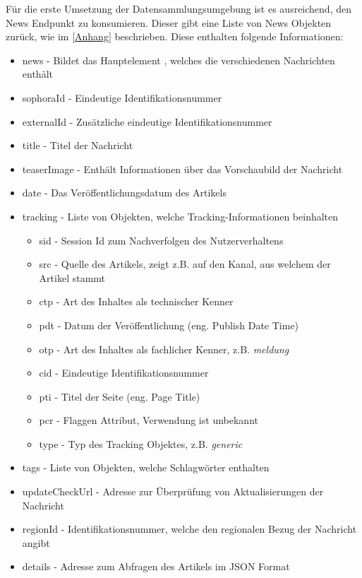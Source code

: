 Für die erste Umsetzung der Datensammlungsumgebung ist es ausreichend, den News Endpunkt zu konsumieren. Dieser gibt eine Liste von News Objekten zurück, wie im \ref{Anhang} beschrieben. Diese enthalten folgende Informationen:
\begin{itemize}
    \item news - Bildet das Hauptelement , welches die verschiedenen Nachrichten enthält
    \item sophoraId - Eindeutige Identifikationsnummer 
    \item externalId - Zusätzliche eindeutige Identifikationsnummer
    \item title - Titel der Nachricht
    \item teaserImage - Enthält Informationen über das Vorschaubild der Nachricht
    \item date - Das Veröffentlichungsdatum des Artikels
    \item tracking - Liste von Objekten, welche Tracking-Informationen beinhalten
    \begin{itemize}
        \item sid - Session Id zum Nachverfolgen des Nutzerverhaltens
        \item src - Quelle des Artikels, zeigt z.B. auf den Kanal, aus welchem der Artikel stammt
        \item ctp - Art des Inhaltes als technischer Kenner
        \item pdt - Datum der Veröffentlichung (eng. Publish Date Time)
        \item otp - Art des Inhaltes als fachlicher Kenner, z.B. \textit{meldung} 
        \item cid - Eindeutige Identifikationsnummer
        \item pti - Titel der Seite (eng. Page Title)
        \item pcr - Flaggen Attribut, Verwendung ist unbekannt
        \item type - Typ des Tracking Objektes, z.B. \textit{generic}
    \end{itemize}
    \item tags - Liste von Objekten, welche Schlagwörter enthalten
    \item updateCheckUrl  - Adresse zur Überprüfung von Aktualisierungen der Nachricht
    \item  regionId - Identifikationsnummer, welche den regionalen Bezug der Nachricht angibt
    \item details - Adresse zum Abfragen des Artikels im JSON Format

\end{itemize}
